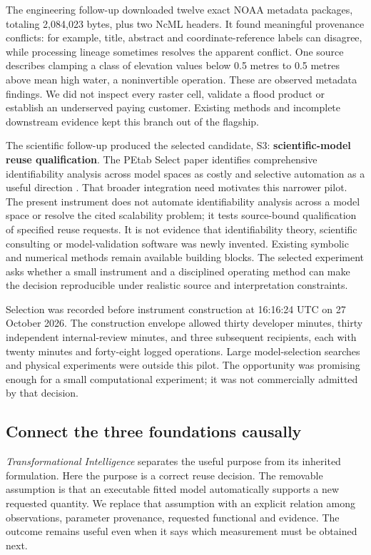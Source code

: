 The engineering follow-up downloaded twelve exact NOAA metadata packages, totaling 2,084,023 bytes, plus two NcML headers. It found meaningful provenance conflicts: for example, title, abstract and coordinate-reference labels can disagree, while processing lineage sometimes resolves the apparent conflict. One source describes clamping a class of elevation values below 0.5 metres to 0.5 metres above mean high water, a noninvertible operation. These are observed metadata findings. We did not inspect every raster cell, validate a flood product or establish an underserved paying customer. Existing methods and incomplete downstream evidence kept this branch out of the flagship.

The scientific follow-up produced the selected candidate, S3: \textbf{scientific-model reuse qualification}. The PEtab Select paper identifies comprehensive identifiability analysis across model spaces as costly and selective automation as a useful direction \cite{petabselect}. That broader integration need motivates this narrower pilot. The present instrument does not automate identifiability analysis across a model space or resolve the cited scalability problem; it tests source-bound qualification of specified reuse requests. It is not evidence that identifiability theory, scientific consulting or model-validation software was newly invented. Existing symbolic and numerical methods remain available building blocks. The selected experiment asks whether a small instrument and a disciplined operating method can make the decision reproducible under realistic source and interpretation constraints.

Selection was recorded before instrument construction at 16:16:24 UTC on 27 October 2026. The construction envelope allowed thirty developer minutes, thirty independent internal-review minutes, and three subsequent recipients, each with twenty minutes and forty-eight logged operations. Large model-selection searches and physical experiments were outside this pilot. The opportunity was promising enough for a small computational experiment; it was not commercially admitted by that decision.

\subsection{Connect the three foundations causally}
\emph{Transformational Intelligence} separates the useful purpose from its inherited formulation. Here the purpose is a correct reuse decision. The removable assumption is that an executable fitted model automatically supports a new requested quantity. We replace that assumption with an explicit relation among observations, parameter provenance, requested functional and evidence. The outcome remains useful even when it says which measurement must be obtained next.

